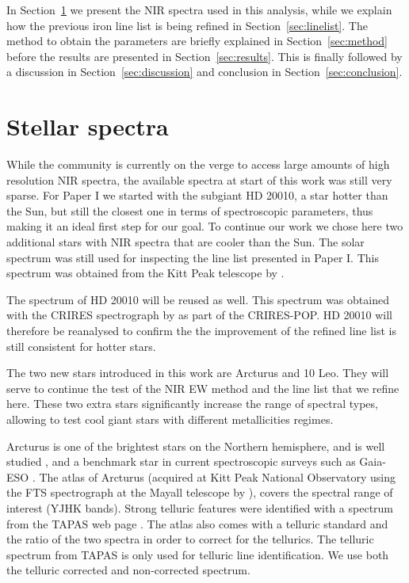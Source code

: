 \documentclass[a4paper,fleqn,usenatbib]{mnras}
\begin{document}
In Section~\ref{sec:data} we present the NIR spectra used in this analysis, while we explain how the
previous iron line list is being refined in Section~\ref{sec:linelist}. The method to obtain the
parameters are briefly explained in Section~\ref{sec:method} before the results are presented in
Section~\ref{sec:results}. This is finally followed by a discussion in Section~\ref{sec:discussion}
and conclusion in Section~\ref{sec:conclusion}.



\section{Stellar spectra}
\label{sec:data}

While the community is currently on the verge to access large amounts of high resolution NIR
spectra, the available spectra at start of this work was still very sparse. For Paper I we started with 
the subgiant HD 20010, a star hotter than the Sun, but still the closest one in terms of spectroscopic 
parameters, thus making it an ideal first step for our goal. To continue our work we chose here two additional 
stars with NIR spectra that are cooler than the Sun. The solar spectrum was still used for inspecting the line 
list presented in Paper I. This spectrum was obtained from the Kitt Peak telescope by \citet{Hinkle1995}.

The spectrum of HD 20010 will be reused as well. This spectrum was obtained with the CRIRES spectrograph 
by \citet{Lebzelter2012} as part of the CRIRES-POP. HD 20010 will therefore be reanalysed to confirm the 
the improvement of the refined line list is still consistent for hotter stars.

The two new stars introduced in this work are Arcturus and 10 Leo. They will serve to continue the test of 
the NIR EW method and the line list that we refine here. These two extra stars significantly increase the 
range of spectral types, allowing to test cool giant stars with different metallicities regimes.

Arcturus is one of the brightest stars on the Northern hemisphere, and is well studied \citep[see e.g.][to mention just a
few]{Griffin1967,McWilliam1990,Ramirez2013}, and a benchmark star in
current spectroscopic surveys such as Gaia-ESO \citep{Jofre2014,Smiljanic2014}.
The atlas of Arcturus (acquired at Kitt Peak National Observatory using the FTS
spectrograph at the Mayall telescope by \citet{Hinkle1995a}), covers the
spectral range of interest (YJHK bands). Strong telluric features were
identified with a spectrum from the TAPAS web page \citep{Bertaux2014}. The
atlas also comes with a telluric standard and the ratio of the two spectra in
order to correct for the tellurics. The telluric spectrum from TAPAS is only
used for telluric line identification. We use both the telluric corrected and
non-corrected spectrum.
\end{document}
